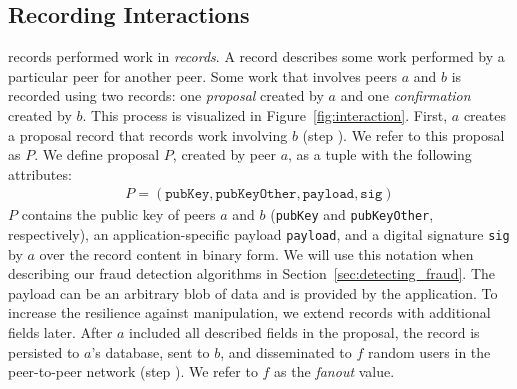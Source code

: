 \subsection{Recording Interactions}
\label{sec:recording_interactions}
\ModelName{} records performed work in \emph{records}.
A record describes some work performed by a particular peer for another peer.
Some work that involves peers $ a $ and $ b $ is recorded using two records: one \emph{proposal} created by $ a $ and one \emph{confirmation} created by $ b $.
This process is visualized in Figure~\ref{fig:interaction}.
First, $ a $ creates a proposal record that records work involving $ b $ (step ).
We refer to this proposal as $ P $.
We define proposal $ P $, created by peer $ a $, as a tuple with the following attributes:
\begin{align*}
	P = (\texttt{pubKey}, \texttt{pubKeyOther}, \texttt{payload}, \texttt{sig})
\end{align*}
$ P $ contains the public key of peers $ a $ and $ b $ (\texttt{pubKey} and \texttt{pubKeyOther}, respectively), an application-specific payload \texttt{payload}, and a digital signature \texttt{sig} by $ a $ over the record content in binary form.
We will use this notation when describing our fraud detection algorithms in Section~\ref{sec:detecting_fraud}.
The payload can be an arbitrary blob of data and is provided by the application.
To increase the resilience against manipulation, we extend records with additional fields later.
After $ a $ included all described fields in the proposal, the record is persisted to $ a $'s database, sent to $ b $, and disseminated to $ f $ random users in the peer-to-peer network (step ).
We refer to $ f $ as the \emph{fanout} value.


